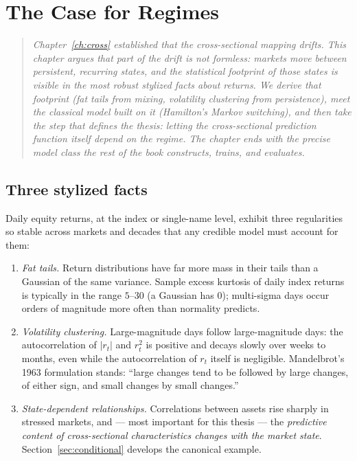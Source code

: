 \chapter{The Case for Regimes}\label{ch:regimes}

\begin{quote}\small\itshape
Chapter~\ref{ch:cross} established that the cross-sectional mapping drifts.
This chapter argues that part of the drift is not formless: markets move
between persistent, recurring \emph{states}, and the statistical footprint of
those states is visible in the most robust stylized facts about returns. We
derive that footprint (fat tails from mixing, volatility clustering from
persistence), meet the classical model built on it (Hamilton's Markov
switching), and then take the step that defines the thesis: letting the
\emph{cross-sectional prediction function itself} depend on the regime. The
chapter ends with the precise model class the rest of the book constructs,
trains, and evaluates.
\end{quote}

\section{Three stylized facts}\label{sec:facts}

Daily equity returns, at the index or single-name level, exhibit three
regularities so stable across markets and decades that any credible model
must account for them:

\begin{enumerate}[label=(F\arabic*),leftmargin=2.2em]
\item \emph{Fat tails.} Return distributions have far more mass in their
  tails than a Gaussian of the same variance. Sample excess kurtosis of daily
  index returns is typically in the range $5$--$30$ (a Gaussian has $0$);
  multi-sigma days occur orders of magnitude more often than normality
  predicts.
\item \emph{Volatility clustering.} Large-magnitude days follow
  large-magnitude days: the autocorrelation of $|r_t|$ and $r_t^2$ is
  positive and decays slowly over weeks to months, even while the
  autocorrelation of $r_t$ itself is negligible. Mandelbrot's 1963
  formulation stands: ``large changes tend to be followed by large changes,
  of either sign, and small changes by small changes.''
\item \emph{State-dependent relationships.} Correlations between assets rise
  sharply in stressed markets, and --- most important for this thesis ---
  the \emph{predictive content of cross-sectional characteristics changes
  with the market state}. Section~\ref{sec:conditional} develops the
  canonical example.
\end{enumerate}

